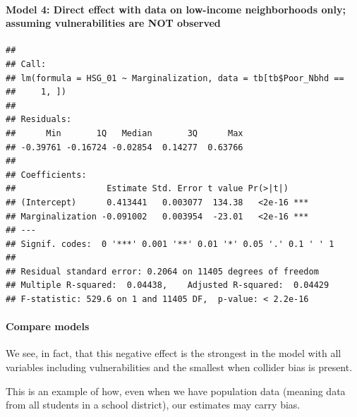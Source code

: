\documentclass[
]{article}
\newenvironment{Shaded}{\begin{snugshade}}{\end{snugshade}}
\newcommand{\AttributeTok}[1]{\textcolor[rgb]{0.13,0.29,0.53}{#1}}
\newcommand{\CommentTok}[1]{\textcolor[rgb]{0.56,0.35,0.01}{\textit{#1}}}
\newcommand{\DecValTok}[1]{\textcolor[rgb]{0.00,0.00,0.81}{#1}}
\newcommand{\FunctionTok}[1]{\textcolor[rgb]{0.13,0.29,0.53}{\textbf{#1}}}
\newcommand{\NormalTok}[1]{#1}
\newcommand{\OtherTok}[1]{\textcolor[rgb]{0.56,0.35,0.01}{#1}}
\newcommand{\SpecialCharTok}[1]{\textcolor[rgb]{0.81,0.36,0.00}{\textbf{#1}}}
\begin{document}
\paragraph{Model 4: Direct effect with data on low-income neighborhoods
only; assuming vulnerabilities are NOT
observed}\label{model-4-direct-effect-with-data-on-low-income-neighborhoods-only-assuming-vulnerabilities-are-not-observed}

\begin{Shaded}
\end{Shaded}

\begin{verbatim}
## 
## Call:
## lm(formula = HSG_01 ~ Marginalization, data = tb[tb$Poor_Nbhd == 
##     1, ])
## 
## Residuals:
##      Min       1Q   Median       3Q      Max 
## -0.39761 -0.16724 -0.02854  0.14277  0.63766 
## 
## Coefficients:
##                  Estimate Std. Error t value Pr(>|t|)    
## (Intercept)      0.413441   0.003077  134.38   <2e-16 ***
## Marginalization -0.091002   0.003954  -23.01   <2e-16 ***
## ---
## Signif. codes:  0 '***' 0.001 '**' 0.01 '*' 0.05 '.' 0.1 ' ' 1
## 
## Residual standard error: 0.2064 on 11405 degrees of freedom
## Multiple R-squared:  0.04438,    Adjusted R-squared:  0.04429 
## F-statistic: 529.6 on 1 and 11405 DF,  p-value: < 2.2e-16
\end{verbatim}

\paragraph{Compare models}\label{compare-models}

We see, in fact, that this negative effect is the strongest in the model
with all variables including vulnerabilities and the smallest when
collider bias is present.

This is an example of how, even when we have population data (meaning
data from all students in a school district), our estimates may carry
bias.
\end{document}
